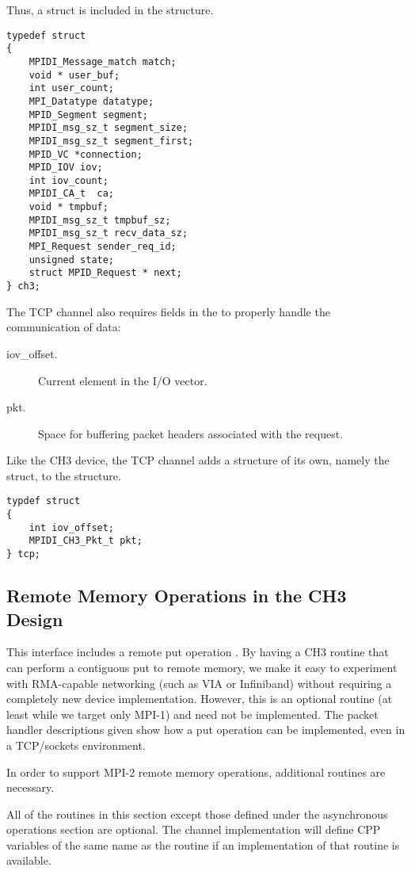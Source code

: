 \documentclass{article}
\begin{document}
Thus, a  struct is included in the  structure.
\begin{verbatim}
typedef struct
{ 
    MPIDI_Message_match match;
    void * user_buf;
    int user_count;
    MPI_Datatype datatype;
    MPID_Segment segment;
    MPIDI_msg_sz_t segment_size;
    MPIDI_msg_sz_t segment_first;
    MPID_VC *connection;
    MPID_IOV iov;
    int iov_count;
    MPIDI_CA_t  ca;
    void * tmpbuf;
    MPIDI_msg_sz_t tmpbuf_sz;
    MPIDI_msg_sz_t recv_data_sz;
    MPI_Request sender_req_id;
    unsigned state;
    struct MPID_Request * next;
} ch3;
\end{verbatim}

The TCP channel also requires fields in the  to
properly handle the communication of data:
\begin{description}
\item[iov\_offset.]Current element in the I/O vector.
\item[pkt.]Space for buffering packet headers associated with the request.
\end{description}

Like the CH3 device, the TCP channel adds a structure of its own,
namely the  struct, to the  structure.
\begin{verbatim}
typdef struct
{
    int iov_offset;
    MPIDI_CH3_Pkt_t pkt;
} tcp;
\end{verbatim}

\subsection{Remote Memory Operations in the CH3 Design}
This interface includes a remote put operation .
By having a CH3 routine that can perform a contiguous put to remote memory, we
make it easy to experiment with RMA-capable networking (such as VIA or
Infiniband) without 
requiring a completely new device implementation.  However, this is an
optional routine (at least while we target only MPI-1) and need not be
implemented.  The packet handler descriptions given show how a put
operation can be implemented, even in a TCP/sockets environment.

In order to support MPI-2 remote memory operations, additional
routines are necessary. 

All of the routines in this section except those defined under the
asynchronous operations section are optional.  The channel implementation
will define CPP variables of the same name as the routine if an
implementation of that routine is available.
\end{document}
